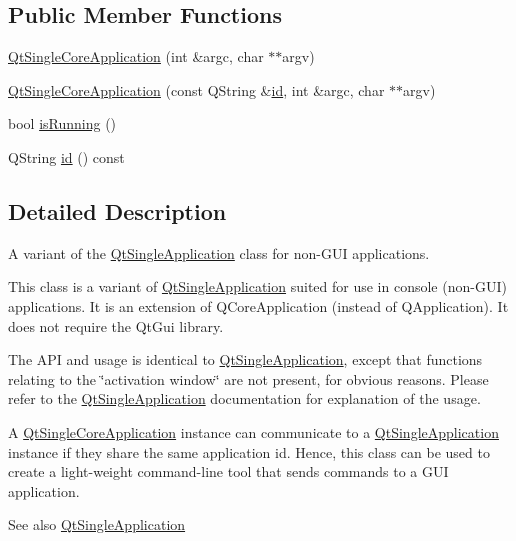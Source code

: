 \subsection*{Public Member Functions}
\begin{DoxyCompactItemize}
\item 
\hyperlink{class_qt_single_core_application_a1329cb65a5706c21257f191b9d8b6548}{Qt\+Single\+Core\+Application} (int \&argc, char $\ast$$\ast$argv)
\item 
\hyperlink{class_qt_single_core_application_a2c5792a0addef95dd78b37ab55a985a7}{Qt\+Single\+Core\+Application} (const Q\+String \&\hyperlink{class_qt_single_core_application_ac49e5d009f1f40f17168b89801afe152}{id}, int \&argc, char $\ast$$\ast$argv)
\item 
bool \hyperlink{class_qt_single_core_application_a419bfb7b02f0459f4d207d448bc6c876}{is\+Running} ()
\item 
Q\+String \hyperlink{class_qt_single_core_application_ac49e5d009f1f40f17168b89801afe152}{id} () const
\end{DoxyCompactItemize}


\subsection{Detailed Description}
A variant of the \hyperlink{class_qt_single_application}{Qt\+Single\+Application} class for non-\/\+G\+UI applications. 

This class is a variant of \hyperlink{class_qt_single_application}{Qt\+Single\+Application} suited for use in console (non-\/\+G\+UI) applications. It is an extension of Q\+Core\+Application (instead of Q\+Application). It does not require the Qt\+Gui library.

The A\+PI and usage is identical to \hyperlink{class_qt_single_application}{Qt\+Single\+Application}, except that functions relating to the \char`\"{}activation window\char`\"{} are not present, for obvious reasons. Please refer to the \hyperlink{class_qt_single_application}{Qt\+Single\+Application} documentation for explanation of the usage.

A \hyperlink{class_qt_single_core_application}{Qt\+Single\+Core\+Application} instance can communicate to a \hyperlink{class_qt_single_application}{Qt\+Single\+Application} instance if they share the same application id. Hence, this class can be used to create a light-\/weight command-\/line tool that sends commands to a G\+UI application.

\begin{DoxySeeAlso}{See also}
\hyperlink{class_qt_single_application}{Qt\+Single\+Application} 
\end{DoxySeeAlso}


